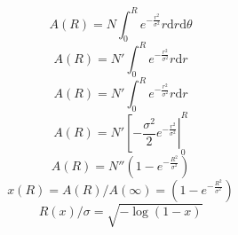 \documentclass[11pt]{article}
\newcommand{\dee}{\mathrm{d}}
\begin{document}
\[A(R) = N\int_0^R e^{-\frac{r^2}{\sigma^2}} r\dee r\dee\theta\]
\[A(R) = N'\int_0^R e^{-\frac{r^2}{\sigma^2}} r\dee r\]
\[A(R) = N'\int_0^R e^{-\frac{r^2}{\sigma^2}} r\dee r\]
\[A(R) = N'\left[-\frac{\sigma^2}{2}e^{-\frac{r^2}{\sigma^2}}\right|_0^R\]
\[A(R) = N''\left(1-e^{-\frac{R^2}{\sigma^2}}\right)\]
\[x(R) = A(R)/A(\infty) = \left(1-e^{-\frac{R^2}{\sigma^2}}\right)\]
\[R(x)/\sigma = \sqrt{-\log(1-x)}\]
\end{document}
